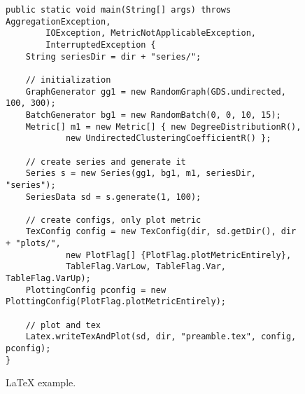 \begin{figure} [bh]
\begin{lstlisting}
public static void main(String[] args) throws AggregationException,
		IOException, MetricNotApplicableException,
		InterruptedException {
	String seriesDir = dir + "series/";

	// initialization
	GraphGenerator gg1 = new RandomGraph(GDS.undirected, 100, 300);
	BatchGenerator bg1 = new RandomBatch(0, 0, 10, 15);
	Metric[] m1 = new Metric[] { new DegreeDistributionR(),
			new UndirectedClusteringCoefficientR() };

	// create series and generate it
	Series s = new Series(gg1, bg1, m1, seriesDir, "series");
	SeriesData sd = s.generate(1, 100);

	// create configs, only plot metric
	TexConfig config = new TexConfig(dir, sd.getDir(), dir + "plots/",
			new PlotFlag[] {PlotFlag.plotMetricEntirely},
			TableFlag.VarLow, TableFlag.Var, TableFlag.VarUp);
	PlottingConfig pconfig = new PlottingConfig(PlotFlag.plotMetricEntirely);

	// plot and tex
	Latex.writeTexAndPlot(sd, dir, "preamble.tex", config, pconfig);
}
\end{lstlisting}
\caption{LaTeX example.}
\label{code:example}
\end{figure}